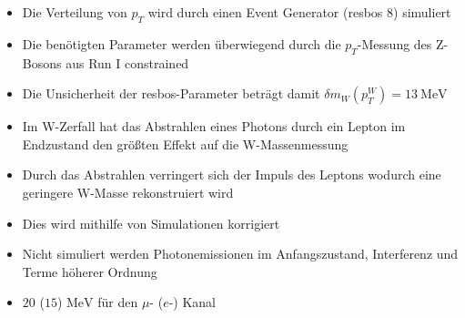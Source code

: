 \documentclass[aspectratio=1610, 9pt]{beamer}
\begin{document}
\begin{frame}
  \begin{itemize}
    \item Die Verteilung von $p_T$ wird durch einen Event Generator (resbos 8) simuliert
    \item Die benötigten Parameter werden überwiegend durch die $p_T$-Messung des Z-Bosons aus Run I constrained
    \item Die Unsicherheit der resbos-Parameter beträgt damit $\delta m_W (p^W_T) = \SI{13}{\MeV}$
  \end{itemize}


\end{frame}

\begin{frame}
  \begin{itemize}
    \item Im W-Zerfall hat das Abstrahlen eines Photons durch ein Lepton im Endzustand den größten Effekt auf die W-Massenmessung
    \item Durch das Abstrahlen verringert sich der Impuls des Leptons wodurch eine geringere W-Masse rekonstruiert wird
    \item Dies wird mithilfe von Simulationen korrigiert
    \item Nicht simuliert werden Photonemissionen im Anfangszustand, Interferenz und Terme höherer Ordnung
    \item[\rightarrow] $\num{20}$ ($\num{15}$) $\si{\MeV}$ für den $\mu$- ($e$-) Kanal

  \end{itemize}
\end{frame}
\end{document}
